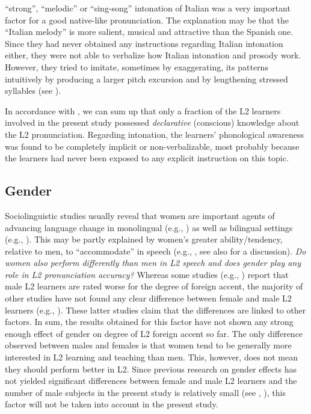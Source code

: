“strong”, “melodic” or “sing-song” intonation of Italian was a very important factor for a good native-like pronunciation. The explanation may be that the “Italian melody” is more salient, musical and attractive than the Spanish one. Since they had never obtained any instructions regarding Italian intonation either, they were not able to verbalize how Italian intonation and prosody work. However, they tried to imitate, sometimes by exaggerating, its patterns intuitively by producing a larger pitch excursion and by lengthening stressed syllables (see ).



In accordance with \citet{Kivistö-deSouza2015}, we can sum up that only a fraction of the L2 learners involved in the present study possessed \textit{declarative} (conscious) knowledge about the L2 pronunciation. Regarding intonation, the learners’ phonological awareness was found to be completely implicit or non-ver\-bal\-i\-zable, most probably because the learners had never been exposed to any explicit instruction on this topic.


\subsection{Gender}\label{sec:2.1.6} %

Sociolinguistic studies usually reveal that women are important agents of advancing language change in monolingual (e.g., \citealt{Labov2001, EckertMcConnell-Ginet2003}) as well as bilingual settings (e.g.,  \citealt{LapidusShin2013}). This may be partly explained by women’s greater ability/tendency, relative to men, to “accommodate” in speech (e.g., \citealt{AsherGarcía1969, LeaperFriedman2007, Palomares2008}, see also \citealt{HancockRubin2014} for a discussion). \textit{Do women also perform differently than men in L2 speech and does gender play any role in L2 pronunciation accuracy? }Whereas some studies (e.g., \citealt{TahtaEtAl1981, Thompson1991, MunroMann2005, Hinton2013}) report that male L2 learners are rated worse for the degree of foreign accent, the majority of other studies have not found any clear difference between female and male L2 learners (e.g., \citealt{PurcellSuter1980, Elliott1995, FlegeEtAl1995, PiskeEtAl2001}). These latter studies claim that the differences are linked to other factors. In sum, the results obtained for this factor have not shown any strong enough effect of gender on degree of L2 foreign accent so far. The only difference observed between males and females is that women tend to be generally more interested in L2 learning and teaching than men. This, however, does not mean they should perform better in L2. Since previous research on gender effects has not yielded significant differences between female and male L2 learners and the number of male subjects in the present study is relatively small (see , \textit{}), this factor will not be taken into account in the present study.

